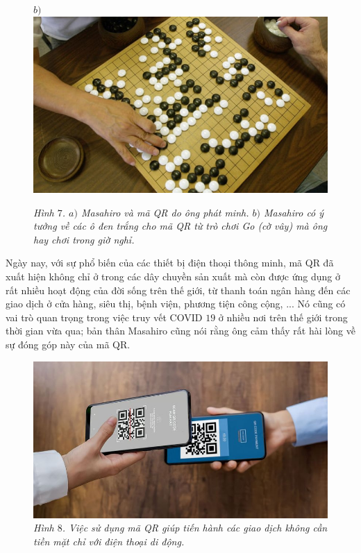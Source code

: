 \begin{multicols}{2}
\begin{figure}[H]
		$b)$\includegraphics[width= 0.95\linewidth]{15}
		\caption{\small\textit{\color{toanhocdoisong}Hình $7$. $a)$ Masahiro và mã QR do ông phát minh. $b)$ Masahiro có ý tưởng về các ô đen trắng cho mã QR từ trò chơi Go (cờ vây) mà ông hay chơi trong giờ nghỉ.}}
		\vspace*{-10pt}
	\end{figure}
	Ngày nay, với sự phổ biến của các thiết bị điện thoại thông minh, mã QR đã xuất hiện không chỉ ở trong các dây chuyền sản xuất mà còn được ứng dụng ở rất nhiều hoạt động của đời sống trên thế giới, từ thanh toán ngân hàng đến các giao dịch ở cửa hàng, siêu thị, bệnh viện, phương tiện công cộng, ... Nó cũng có vai trò quan trọng trong việc truy vết COVID $19$ ở nhiều nơi trên thế giới trong thời gian vừa qua; bản thân Masahiro cũng nói rằng ông cảm thấy rất hài lòng về sự đóng góp này của mã QR.
	\begin{figure}[H]
		\vspace*{-5pt}
		\centering
		\captionsetup{labelformat= empty, justification=centering}
		\includegraphics[width= 1\linewidth]{16}
		\caption{\small\textit{\color{toanhocdoisong}Hình $8$. Việc sử dụng mã QR giúp tiến hành các giao dịch không cần tiền mặt chỉ với điện thoại di động.}}

\end{figure}
\end{multicols}
